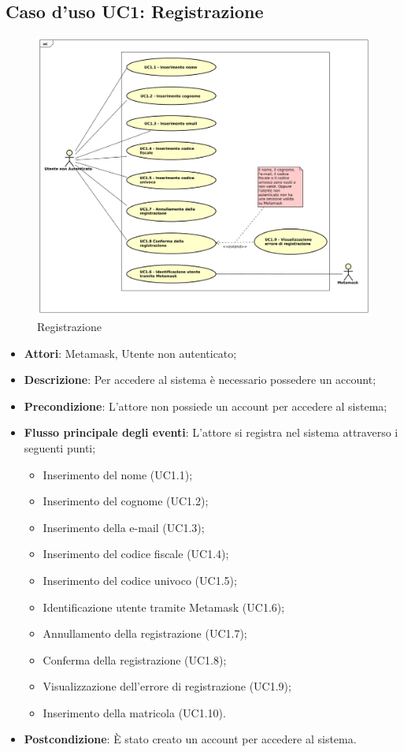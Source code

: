 \subsection{Caso d'uso \texorpdfstring{UC1}{UC1}: Registrazione }
\begin{figure} [H]
	\centering
	\includegraphics[scale=0.45]{./img/UC1.pdf}
	\caption{Registrazione }\label{}
\end{figure}
\begin{itemize}
	\item \textbf{Attori}: Metamask, Utente non autenticato;
	\item \textbf{Descrizione}: Per accedere al sistema è necessario possedere un account;
	\item \textbf{Precondizione}: L'attore non possiede un account per accedere al sistema;
	\item \textbf{Flusso principale degli eventi}: L'attore si registra nel sistema attraverso i seguenti punti;
	\begin{itemize}
		\item Inserimento del nome (UC1.1);
		\item Inserimento del cognome (UC1.2);
		\item Inserimento della e-mail (UC1.3);
		\item Inserimento del codice fiscale (UC1.4);
		\item Inserimento del codice univoco (UC1.5);
		\item Identificazione utente tramite Metamask (UC1.6);
		\item Annullamento della registrazione (UC1.7);
		\item Conferma della registrazione (UC1.8);
		\item Visualizzazione dell'errore di registrazione (UC1.9);
		\item Inserimento della matricola (UC1.10).
	\end{itemize}
	\item \textbf{Postcondizione}: È stato creato un account per accedere al sistema.
\end{itemize}
